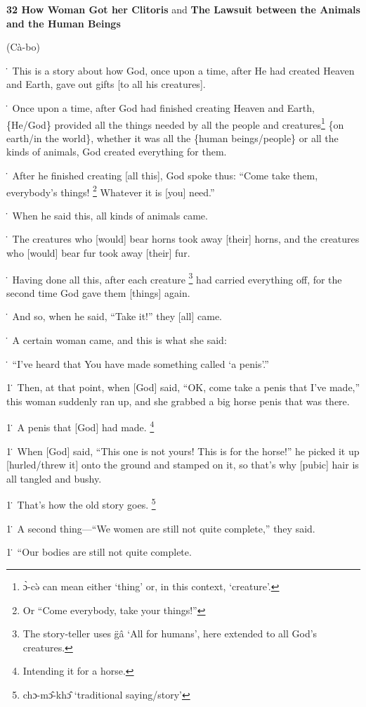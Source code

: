
\textbf{32 How Woman Got her Clitoris} and \textbf{The Lawsuit between the Animals
and the Human Beings}

(Cà-bo)

\. This is a story about how God, once upon a time, after He had created Heaven
and Earth, gave out gifts [to all his creatures].

\. Once upon a time, after God had finished creating Heaven and Earth, \{He/God\}
provided all the things needed by all the people and creatures\footnote{ɔ̀-cə̀ can mean either `thing' or, in this context, `creature'.} \{on earth/in
the world\}, whether it was all the \{human beings/people\} or all the kinds of
animals, God created everything for them.

\. After he finished creating [all this], God spoke thus: ``Come take them, everybody's
things! \footnote{Or ``Come everybody, take your things!''}  Whatever it is [you] need.''

\. When he said this, all kinds of animals came.

\. The creatures who [would] bear horns took away [their] horns, and the creatures
who [would] bear fur took away [their] fur.

\. Having done all this, after each creature \footnote{The story-teller uses g̈â `All for humans', here extended to all God's creatures.} had carried everything off, for
the second time God gave them [things] again.

\. And so, when he said, ``Take it!'' they [all] came.

\. A certain woman came, and this is what she said:

\. ``I've heard that You have made something called `a penis'.''

1\. Then, at that point, when [God] said, ``OK, come take a penis that I've made,''
this woman suddenly ran up, and she grabbed a big horse penis that was there.

1\. A penis that [God] had made. \footnote{Intending it for a horse.}

1\. When [God] said, ``This one is not yours! This is for the horse!'' he picked
it up [hurled/threw it] onto the ground and stamped on it, so that's why [pubic]
hair is all tangled and bushy.

1\. That's how the old story goes. \footnote{chɔ-mɔ̂-khɔ̂ `traditional saying/story'}

1\. A second thing---``We women are still not quite complete,'' they said.

1\. ``Our bodies are still not quite complete.

